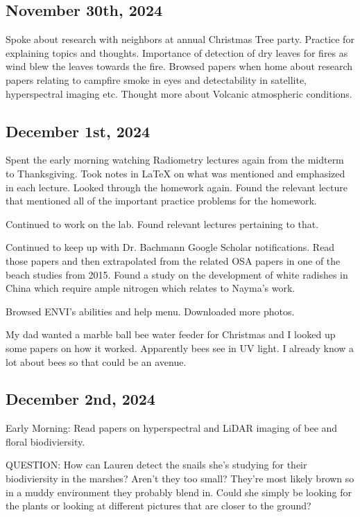 \documentclass{article}
\begin{document}
\subsection{November 30th, 2024}
Spoke about research with neighbors at annual Christmas Tree party. Practice for explaining topics and thoughts. Importance of detection of dry leaves for fires as wind blew the leaves towards the fire. Browsed papers when home about research papers relating to campfire smoke in eyes and detectability in satellite, hyperspectral imaging etc. Thought more about Volcanic atmospheric conditions. 


\subsection{December 1st, 2024}
Spent the early morning watching Radiometry lectures again from the midterm to Thanksgiving. Took notes in LaTeX on what was mentioned and emphasized in each lecture. Looked through the homework again. Found the relevant lecture that mentioned all of the important practice problems for the homework.

Continued to work on the lab. Found relevant lectures pertaining to that. 

Continued  to keep up with Dr. Bachmann Google Scholar notifications. Read those papers and then extrapolated from the related OSA papers in one of the beach studies from 2015. Found a study on the development of white radishes in China which require ample nitrogen which relates to Nayma's work. 

Browsed ENVI's abilities and help menu. Downloaded more photos. 

My dad wanted a marble ball bee water feeder for Christmas and I looked up some papers on how it worked. Apparently bees see in UV light. I already know a lot about bees so that could be an avenue. 

\subsection{December 2nd, 2024}

Early Morning: Read papers on hyperspectral and LiDAR imaging of bee and floral biodiviersity.

QUESTION: 
How can Lauren detect the snails she's studying for their biodiviersity in the marshes? Aren't they too small? They're most likely brown so in a muddy environment they probably blend in. Could she simply be looking for the plants or looking at different pictures that are closer to the ground?
\end{document}
